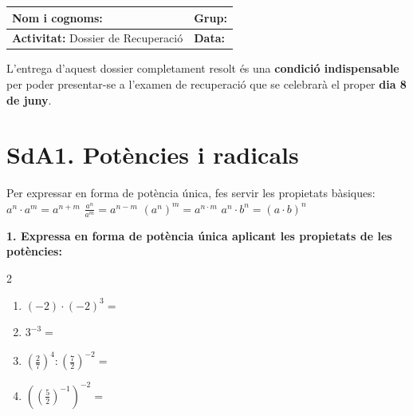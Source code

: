 \documentclass[12pt,a4paper]{article}
\begin{document}
\begingroup
\renewcommand{\arraystretch}{2.2}
\begin{tabularx}{\textwidth}{|X|p{4cm}|}
\hline
\textbf{Nom i cognoms:} & \textbf{Grup:} \\ \hline
\textbf{Activitat:} Dossier de Recuperació & \textbf{Data:} \\ \hline
\end{tabularx}
\endgroup

\vspace{0.5cm}

\begin{tcolorbox}[colback=red!5!white, colframe=red!75!black, title=⚠️ Condició d'Examen, fonttitle=\bfseries\large, arc=2mm]
L'entrega d'aquest dossier completament resolt és una \textbf{condició indispensable} per poder presentar-se a l'examen de recuperació que se celebrarà el proper \textbf{dia 8 de juny}. 
\end{tcolorbox}

\section*{SdA1. Potències i radicals}

\begin{capsula}
Per expressar en forma de potència única, fes servir les propietats bàsiques: \\
$a^n \cdot a^m = a^{n+m}$ \hspace{1cm} $\frac{a^n}{a^m} = a^{n-m}$ \hspace{1cm} $(a^n)^m = a^{n \cdot m}$ \hspace{1cm} $a^n \cdot b^n = (a \cdot b)^n$
\end{capsula}

\textbf{1. Expressa en forma de potència única aplicant les propietats de les potències:}
\begin{multicols}{2}
\begin{enumerate}[label=\alph*)]
    \item $(-2) \cdot (-2)^3 =$ \vspace{0.5cm}
    \item $3^{-3} =$ \vspace{0.5cm}
    \item $\left(\frac{2}{7}\right)^4 : \left(\frac{7}{2}\right)^{-2} =$ \vspace{0.5cm}
    \item $\left(\left(\frac{5}{2}\right)^{-1}\right)^{-2} =$ \vspace{0.5cm}
\end{enumerate}
\end{multicols}
\end{document}
